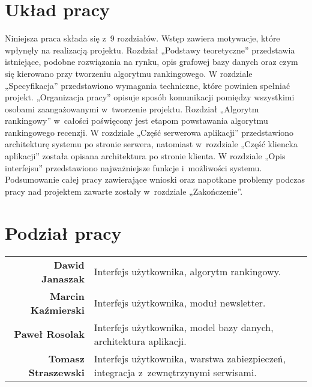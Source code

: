 \section{Układ pracy}
Niniejsza praca składa się z~9 rozdziałów. Wstęp zawiera motywacje, które wpłynęły na realizacją projektu. Rozdział „Podstawy teoretyczne” przedstawia istniejące, podobne rozwiązania na rynku, opis grafowej bazy danych oraz czym się kierowano przy tworzeniu algorytmu rankingowego. W rozdziale „Specyfikacja” przedstawiono wymagania techniczne, które powinien spełniać projekt. „Organizacja pracy” opisuje sposób komunikacji pomiędzy wszystkimi osobami zaangażowanymi w~tworzenie projektu.  Rozdział „Algorytm rankingowy” w~całości poświęcony jest etapom powstawania algorytmu rankingowego recenzji. W rozdziale „Część serwerowa aplikacji” przedstawiono architekturę systemu po stronie serwera, natomiast w~rozdziale „Część kliencka aplikacji” została opisana architektura po stronie klienta. W rozdziale „Opis interfejsu” przedstawiono najważniejsze funkcje i~możliwości systemu. Podsumowanie całej pracy zawierające wnioski oraz napotkane problemy podczas pracy nad projektem zawarte zostały w~rozdziale „Zakończenie”.


\section{Podział pracy}
\noindent\begin{tabular}{rp{9cm}}
\textbf{Dawid Janaszak} & Interfejs użytkownika, algorytm rankingowy.\\

\textbf{Marcin Kaźmierski} & Interfejs użytkownika, moduł newsletter.\\

\textbf{Paweł Rosolak} & Interfejs użytkownika, model bazy danych, architektura aplikacji.\\

\textbf{Tomasz Straszewski} & Interfejs użytkownika, warstwa zabiezpieczeń, integracja z~zewnętrzynymi serwisami.\\
\end{tabular}

